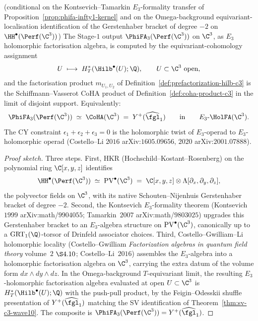 \begin{theorem}
\label{thm:sv-e3-factorization-wave10}
\ClaimStatusConditional\textup{ (conditional on the Kontsevich--Tamarkin
$E_3$-formality transfer of Proposition~\ref{prop:phifa-infty1-kernel}
and on the Omega-background equivariant-localisation identification of
the Gerstenhaber bracket of degree $-2$ on
$\HH^\bullet(\Perf(\C^3))$)}
The Stage-$1$ output $\PhiFA_3(\Perf(\C^3))$ on $\C^3$, as $E_3$
holomorphic factorisation algebra, is computed by the
equivariant-cohomology assignment
\[
 U \;\longmapsto\; H^*_T(\Hilb^\bullet(U); \Q),
 \qquad U \subset \C^3\ \text{open},
\]
and the factorisation product $m_{U_1, U_2}$ of
Definition~\ref{def:prefactorization-hilb-c3} is the
Schiffmann--Vasserot CoHA product of Definition~\ref{def:coha-product-c3}
in the limit of disjoint support. Equivalently:
\[
 \PhiFA_3(\Perf(\C^3)) \;\simeq\; \CoHA(\C^3) \;=\; Y^+(\widehat{\fgl}_1)
 \qquad\text{in}\qquad E_3\text{-}\HolFA(\C^3).
\]
The CY constraint $\epsilon_1 + \epsilon_2 + \epsilon_3 = 0$ is the
holomorphic twist of $E_3$-operad to $E_3$-holomorphic operad (Costello--Li
$2016$ arXiv:$1605.09656$, $2020$ arXiv:$2001.07888$).
\end{theorem}

\begin{proof}[Proof sketch]
Three steps. First, HKR (Hochschild--Kostant--Rosenberg) on the
polynomial ring $\C[x, y, z]$ identifies
\[
 \HH^\bullet(\Perf(\C^3)) \;\simeq\; \mathrm{PV}^\bullet(\C^3)
 \;=\; \C[x, y, z] \otimes \Lambda[\partial_x, \partial_y, \partial_z],
\]
the polyvector fields on $\C^3$, with its native Schouten--Nijenhuis
Gerstenhaber bracket of degree $-2$. Second, the Kontsevich
$E_3$-formality theorem (Kontsevich~$1999$ arXiv:math/$9904055$;
Tamarkin~$2007$ arXiv:math/$9803025$) upgrades this Gerstenhaber
bracket to an $E_3$-algebra structure on $\mathrm{PV}^\bullet(\C^3)$,
canonically up to a $\mathrm{GRT}_1(\Q)$-torsor of Drinfeld associator
choices. Third, Costello--Gwilliam--Li holomorphic locality (Costello--Gwilliam
\textit{Factorization algebras in quantum field theory} volume~$2$
$\S 4.10$; Costello--Li~$2016$) assembles the $E_3$-algebra into a
holomorphic factorisation algebra on $\C^3$, carrying the extra datum
of the volume form $dx \wedge dy \wedge dz$. In the Omega-background
$T$-equivariant limit, the resulting $E_3$-holomorphic factorisation
algebra evaluated at open $U \subset \C^3$ is
$H^*_T(\Hilb^\bullet(U); \Q)$ with the push-pull product, by the
Feigin--Odesskii shuffle presentation of
$Y^+(\widehat{\fgl}_1)$ matching the SV identification of
Theorem~\ref{thm:sv-c3-wave10}. The composite is
$\PhiFA_3(\Perf(\C^3)) = Y^+(\widehat{\fgl}_1)$.
\end{proof}

